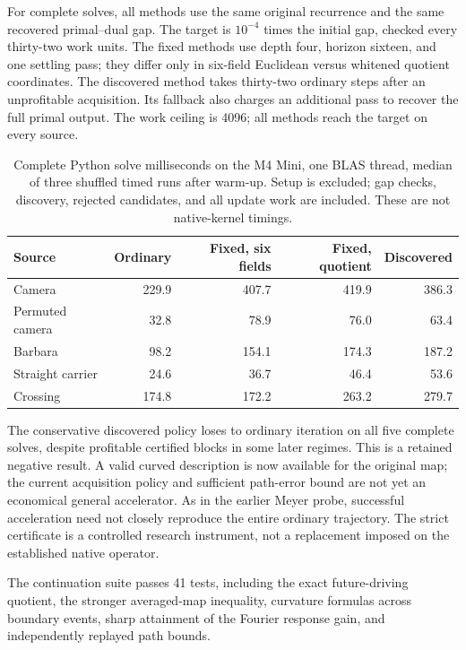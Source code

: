 For complete solves, all methods use the same original recurrence and the same recovered primal--dual gap. The target is $10^{-4}$ times the initial gap, checked every thirty-two work units. The fixed methods use depth four, horizon sixteen, and one settling pass; they differ only in six-field Euclidean versus whitened quotient coordinates. The discovered method takes thirty-two ordinary steps after an unprofitable acquisition. Its fallback also charges an additional pass to recover the full primal output. The work ceiling is 4096; all methods reach the target on every source.

\begin{table}[htbp]\centering\small

\begin{tabular}{l rrrr}\toprule

Source & Ordinary & Fixed, six fields & Fixed, quotient & Discovered\\\midrule

Camera & 229.9 & 407.7 & 419.9 & 386.3\\

Permuted camera & 32.8 & 78.9 & 76.0 & 63.4\\

Barbara & 98.2 & 154.1 & 174.3 & 187.2\\

Straight carrier & 24.6 & 36.7 & 46.4 & 53.6\\

Crossing & 174.8 & 172.2 & 263.2 & 279.7\\

\bottomrule\end{tabular}

\caption{Complete Python solve milliseconds on the M4 Mini, one BLAS thread, median of three shuffled timed runs after warm-up. Setup is excluded; gap checks, discovery, rejected candidates, and all update work are included. These are not native-kernel timings.}

\label{tab:curvedsolve}\end{table}

The conservative discovered policy loses to ordinary iteration on all five complete solves, despite profitable certified blocks in some later regimes. This is a retained negative result. A valid curved description is now available for the original map; the current acquisition policy and sufficient path-error bound are not yet an economical general accelerator. As in the earlier Meyer probe, successful acceleration need not closely reproduce the entire ordinary trajectory. The strict certificate is a controlled research instrument, not a replacement imposed on the established native operator.

The continuation suite passes 41 tests, including the exact future-driving quotient, the stronger averaged-map inequality, curvature formulas across boundary events, sharp attainment of the Fourier response gain, and independently replayed path bounds.
